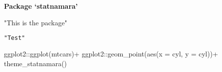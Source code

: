 \documentclass[a4paper]{book}
\begin{document}
\chapter*{}
\begin{center}
{\textbf{\huge Package `statnamara'}}
\par\bigskip{\large \today}
\end{center}
\begin{description}
\raggedright{}
\item[Type]
\item[Title]
\item[Version]
\item[Author]
\item[Maintainer]\AsIs{}
\item[Description]
\item[License]
\item[Encoding]
\item[NeedsCompilation]
\end{description}
%
\begin{Description}
"This is the package" 
\end{Description}
%
\begin{Usage}
\begin{verbatim}
"Test"
\end{verbatim}
\end{Usage}
%
\begin{Examples}
\begin{ExampleCode}
ggplot2::ggplot(mtcars)+
  ggplot2::geom_point(aes(x = cyl, y = cyl))+
    theme_statnamara()
\end{ExampleCode}
\end{Examples}
\printindex{}
\end{document}
